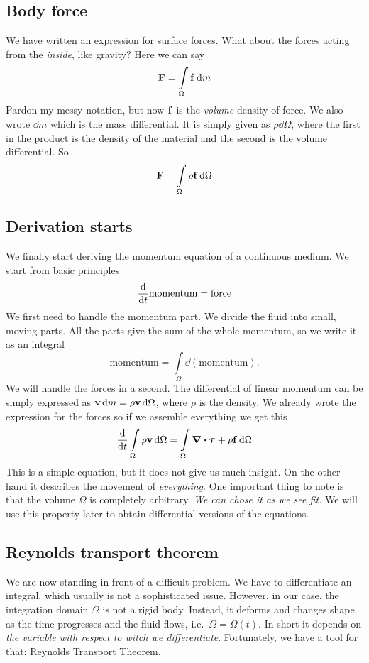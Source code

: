 \documentclass[justified, nobib]{tufte-handout}
\begin{document}
\subsection{Body force}
We have written an expression for surface forces. What about the forces
acting from the \emph{inside}, like gravity? Here we can say
\[
	\vb{F} = \int\limits_\Omega \vb{f} \dd{m}
\]
Pardon my messy notation, but now \(\vb{f}\) is the \emph{volume} density
of force. We also wrote \(\dd{m}\) which is the mass differential. It is
simply given as \(\rho\dd{\Omega}\), where the first in the product is the
density of the material and the second is the volume differential. So
\[
	\vb{F} = \int\limits_\Omega \rho\vb{f} \dd{\Omega}
\]

\subsection{Derivation starts}
We finally start deriving the momentum equation of a continuous medium.
We start from basic principles
\[
	\dv{t}\text{momentum} = {\text{force}}
\]
We first need to handle the momentum part. We divide the fluid into small,
moving parts. All the parts give the sum of the whole momentum, so we write
it as an integral
\[
	\text{momentum} = \int\limits_\Omega \dd{ (\text{momentum})}.
\]
We will handle the forces in a second. The differential of linear momentum
can be simply expressed as \(\vb{v}\dd{m} = \rho\vb{v} \dd{\Omega}\), where
\(\rho\) is the density. We already wrote the expression for the forces so
if we assemble everything we get this
\begin{equation}\label{eq::mom_part}
	\dv{t}\int\limits_\Omega \rho\vb{v} \dd{\Omega} =
	\int\limits_\Omega  \div\bm{\tau} + \rho\vb{f} \dd{\Omega}
\end{equation}
This is a simple equation, but it does not give us much insight. On the other
hand it describes the movement of \emph{everything}. One important thing to
note is that the volume \(\Omega\) is completely arbitrary. \emph{We can
	chose it as we see fit.} We will use this property later to obtain
differential versions of the equations.

\subsection{Reynolds transport theorem}
We are now standing in front of a difficult problem. We have to
differentiate an integral, which usually is not a sophisticated
issue. However, in our case, the integration domain \(\Omega\)
is not a rigid body. Instead, it deforms and changes shape as the time progresses
and the fluid flows, i.e.\ \(\Omega = \Omega(t)\). In short it depends on
\emph{the variable with respect to witch we differentiate}.
Fortunately, we have a tool for that: Reynolds Transport Theorem.
\end{document}
